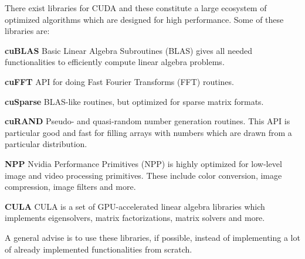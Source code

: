 There exist libraries for CUDA and these constitute a large ecosystem of optimized algorithms which are designed for high performance.
Some of these libraries are:
\begin{itemizeSmall}
	\item [\textbf{cuBLAS}] Basic Linear Algebra Subroutines (BLAS) gives all needed functionalities to efficiently compute linear algebra problems.
	\item [\textbf{cuFFT}] API for doing Fast Fourier Transforms (FFT) routines.
	\item [\textbf{cuSparse}] BLAS-like routines, but optimized for sparse matrix formats.
	\item [\textbf{cuRAND}] Pseudo- and quasi-random number generation routines. This API is particular good and fast for filling arrays with numbers which are drawn from a particular distribution.
	\item [\textbf{NPP}] Nvidia Performance Primitives (NPP) is highly optimized for low-level image and video processing primitives. These include color conversion, image compression, image filters and more.
	\item [\textbf{CULA}] CULA is a set of GPU-accelerated linear algebra libraries which implements eigensolvers, matrix factorizations, matrix solvers and more.
\end{itemizeSmall}

\noindent A general advise is to use these libraries, if possible, instead of implementing a lot of already implemented functionalities from scratch.

